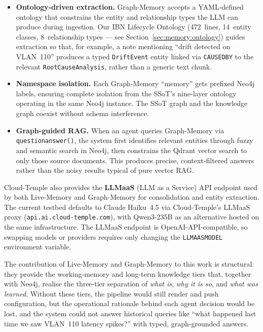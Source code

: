 \documentclass[acmtog]{acmart}
\renewcommand\_{\textunderscore\allowbreak}
\begin{document}
\begin{itemize}
  \item \textbf{Ontology-driven extraction.} Graph-Memory
    accepts a YAML-defined ontology that constrains the entity
    and relationship types the LLM can produce during
    ingestion. Our IBN Lifecycle Ontology (472~lines, 14~entity
    classes, 8~relationship types --- see
    Section~\ref{sec:memory:ontology}) guides extraction so
    that, for example, a note mentioning ``drift detected on
    VLAN~110'' produces a typed \texttt{DriftEvent} entity
    linked via \texttt{CAUSED\_BY} to the relevant
    \texttt{RootCauseAnalysis}, rather than a generic text
    chunk.

  \item \textbf{Namespace isolation.} Each Graph-Memory
    ``memory'' gets prefixed Neo4j labels, ensuring complete
    isolation from the SSoT's nine-layer ontology operating in
    the same Neo4j instance. The SSoT graph and the knowledge
    graph coexist without schema interference.

  \item \textbf{Graph-guided RAG.} When an agent queries
    Graph-Memory via \texttt{question\_answer()}, the system
    first identifies relevant entities through fuzzy and
    semantic search in Neo4j, then constrains the Qdrant vector
    search to only those source documents. This produces
    precise, context-filtered answers rather than the noisy
    results typical of pure vector RAG.
\end{itemize}

Cloud-Temple also provides the \textbf{LLMaaS} (LLM as a
Service) API endpoint used by both Live-Memory and Graph-Memory
for consolidation and entity extraction. The current testbed
defaults to Claude Haiku~4.5 via Cloud-Temple's LLMaaS proxy
(\texttt{api.ai.cloud-temple.com}), with Qwen3-235B as an
alternative hosted on the same infrastructure. The LLMaaS
endpoint is OpenAI-API-compatible, so swapping models or
providers requires only changing the \texttt{LLMAAS\_MODEL}
environment variable.

The contribution of Live-Memory and Graph-Memory to this work
is structural: they provide the working-memory and long-term
knowledge tiers that, together with Neo4j, realise the
three-tier separation of \emph{what is}, \emph{why it is so},
and \emph{what was learned}. Without these tiers, the pipeline
would still render and push configuration, but the operational
rationale behind each agent decision would be lost, and the
system could not answer historical queries like ``what happened
last time we saw VLAN~110 latency spikes?'' with typed,
graph-grounded answers.
\end{document}
